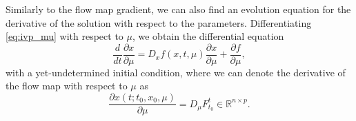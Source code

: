 Similarly to the flow map gradient, we can also find an evolution equation for the derivative of the solution with respect to the parameters. Differentiating \eqref{eq:ivp_mu} with respect to $\mu$, we obtain the differential equation
\begin{equation}
\label{eq:eq_variations_mu}
\frac{d}{dt}\frac{\partial x}{\partial \mu} = D_x f(x, t, \mu) \frac{\partial x}{\partial \mu} + \frac{\partial f}{\partial \mu},
\end{equation}
with a yet-undetermined initial condition, where we can denote the derivative of the flow map with respect to $\mu$ as 
\begin{equation}
\frac{\partial x(t; t_0, x_0, \mu)}{\partial \mu} = D_\mu F_{t_0}^t \in \mathbb{R}^{n\times p}. 
\end{equation}

